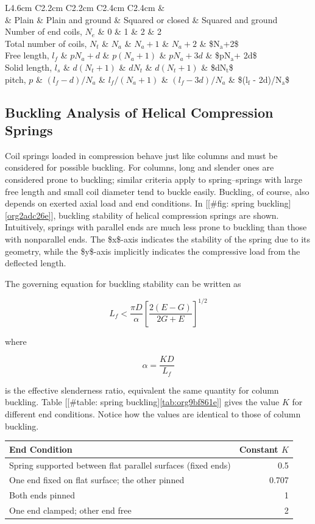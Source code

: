\documentclass[a4paper,openany,12pt]{book}
\begin{document}
{{ L4.6cm C2.2cm C2.2cm C2.4cm C2.4cm \&\\
\& Plain \& Plain and ground \& Squared or closed \& Squared and ground\\
Number of end coils, \(N_e\) \& 0 \& 1 \& 2 \& 2\\
Total number of coils, \(N_t\) \& \(N_a\) \& \(N_a+1\) \& \(N_a+2\) \& \$N\(_{\text{a}}\)+2\$\\
Free length, \(l_f\) \& \(pN_a+d\) \& \(p(N_a+1)\) \& \(pN_a+3d\) \& \$pN\(_{\text{a}}\)+ 2d\$\\
Solid length, \(l_s\) \& \(d(N_t+1)\) \& \(d N_t\) \& \(d(N_t+1)\) \& \$dN\(_{\text{t}}\)\$\\
pitch, \(p\) \& \((l_f - d)/N_a\) \& \(l_f/(N_a + 1)\) \& \((l_f - 3d)/N_a\) \&
\$(l\(_{\text{f}}\) - 2d)/N\(_{\text{a}}\)\$\\

\subsection{Buckling Analysis of Helical Compression Springs}
\label{sec:orgf76de9b}
Coil springs loaded in compression behave just like columns and must be
considered for possible buckling. For columns, long and slender ones are
considered prone to buckling; similar criteria apply to spring--springs
with large free length and small coil diameter tend to buckle easily.
Buckling, of course, also depends on exerted axial load and end
conditions. In [[\#fig: spring buckling]\ref{org2adc26e}],
buckling stability of helical compression springs are shown.
Intuitively, springs with parallel ends are much less prone to buckling
than those with nonparallel ends. The \$x\$-axis indicates the stability
of the spring due to its geometry, while the \$y\$-axis implicitly
indicates the compressive load from the deflected length.

The governing equation for buckling stability can be written as

$$L_f < \frac{\pi D}{\alpha} \left[ \frac{2(E-G)}{2G+E} \right]^{1/2}$$

where

$$\alpha = \frac{KD}{L_f}$$

is the effective slenderness ratio, equivalent the same quantity for
column buckling. Table
[[\#table: spring buckling]\ref{tab:org9bf861e}] gives the value
\(K\) for different end conditions. Notice how the values are identical to
those of column buckling.


\begin{center}
\label{tab:org9bf861e}
\begin{tabular}{lr}
\toprule
End Condition & Constant \(K\)\\
\midrule
Spring supported between flat parallel surfaces (fixed ends) & 0.5\\
One end fixed on flat surface; the other pinned & 0.707\\
Both ends pinned & 1\\
One end clamped; other end free & 2\\
\bottomrule
\end{tabular}
\end{center}

}}
\end{document}
